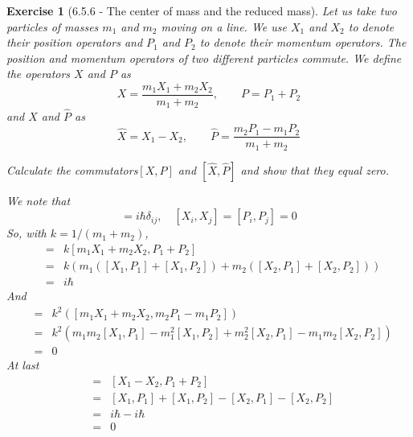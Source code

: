 \documentclass[12pt]{article}
\def\be{\begin{equation}}
\def\ee{\end{equation}}
\def\bea{\begin{eqnarray*}}
\def\eea{\end{eqnarray*}}
\def\f{\frac}
\def\l{\left}
\def\r{\right}
\newtheorem{exercise}{Exercise}
\begin{document}
	\begin{exercise}[6.5.6 -  The center of mass and the reduced mass]
		Let us take two particles of masses $m_1$ and $m_2$ moving on a line. We use $X_1$ and $X_2$ to denote their position operators and $P_1$ and $P_2$ to denote their momentum operators. The position and momentum operators of two different particles commute. We define the operators $X$ and $P$ as
		\be
			X = \f{m_1X_1 + m_2X_2}{m_1+m_2}, \quad\quad P = P_1 + P_2
		\ee
		and $\hat{X}$ and $\hat{P}$ as
		\be
			\hat{X} = X_1 - X_2, \quad\quad \hat{P} = \f{m_2P_1 - m_1P_2}{m_1 + m_2}
		\ee
		\begin{exercises}
			\item Calculate the commutators$[X, P]$ and $[\hat{X}, \hat{P}]$ and show that they equal zero.
			\begin{multianswer}
				We note that
				\be
					[X_i, P_j] = i\hbar \delta_{ij}, \quad [X_i, X_j] = [P_i, P_j] = 0
				\ee
				So, with $k=1/(m_1+m_2)$,
				\bea
					[X, P] &=& k [m_1X_1 + m_2X_2, P_1 + P_2] \\
						&=& k\l( m_1( [X_1, P_1] + [X_1, P_2]) + m_2 ([X_2, P_1] + [X_2, P_2]) \r) \\
						&=& i\hbar
				\eea
				And
				\bea
					[X, \hat{P}] &=& k^2 \l( [m_1X_1 + m_2X_2, m_2P_1 - m_1P_2] \r) \\
						&=& k^2 \l( m_1m_2[X_1, P_1] - m_1^2[X_1, P_2] + m_2^2[X_2, P_1] - m_1m_2[X_2, P_2] \r) \\
						&=& 0 
				\eea
				At last
				\bea
					[\hat{X}, P] &=& [X_1 - X_2, P_1 + P_2] \\
						&=& [X_1, P_1] + [X_1, P_2] - [X_2, P_1] - [X_2, P_2] \\
						&=& i\hbar - i\hbar \\
						&=& 0 
				\eea
			\end{multianswer}
			

\end{exercises}
\end{exercise}
\end{document}
